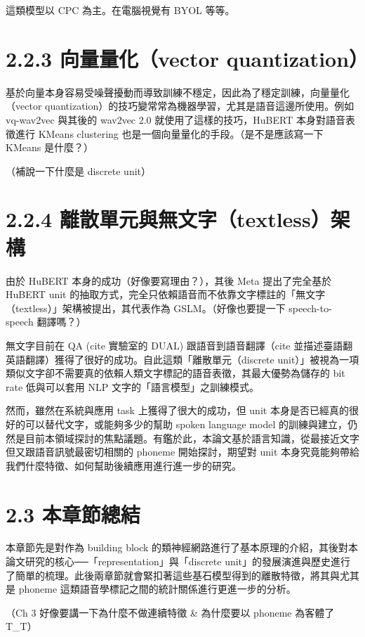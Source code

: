 這類模型以 CPC 為主。在電腦視覺有 BYOL 等等。

\section{2.2.3 向量量化（vector quantization）}

基於向量本身容易受噪聲擾動而導致訓練不穩定，因此為了穩定訓練，向量量化（vector quantization）的技巧變常常為機器學習，尤其是語音這邊所使用。例如 vq-wav2vec 與其後的 wav2vec 2.0 就使用了這樣的技巧，HuBERT 本身對語音表徵進行 KMeans clustering 也是一個向量量化的手段。（是不是應該寫一下 KMeans 是什麼？）

（補說一下什麼是 discrete unit）

\section{2.2.4 離散單元與無文字（textless）架構}

由於 HuBERT 本身的成功（好像要寫理由？），其後 Meta 提出了完全基於 HuBERT unit 的抽取方式，完全只依賴語音而不依靠文字標註的「無文字（textless）」架構被提出，其代表作為 GSLM。（好像也要提一下 speech-to-speech 翻譯嗎？）

無文字目前在 QA (cite 實驗室的 DUAL) 跟語音到語音翻譯（cite 並描述臺語翻英語翻譯）獲得了很好的成功。自此這類「離散單元（discrete unit）」被視為一項類似文字卻不需要真的依賴人類文字標記的語音表徵，其最大優勢為儲存的 bit rate 低與可以套用 NLP 文字的「語言模型」之訓練模式。

然而，雖然在系統與應用 task 上獲得了很大的成功，但 unit 本身是否已經真的很好的可以替代文字，或能夠多少的幫助 spoken language model 的訓練與建立，仍然是目前本領域探討的焦點議題。有鑑於此，本論文基於語言知識，從最接近文字但又跟語音訊號最密切相關的 phoneme 開始探討，期望對 unit 本身究竟能夠帶給我們什麼特徵、如何幫助後續應用進行進一步的研究。

\section{2.3 本章節總結}

本章節先是對作為 building block 的類神經網路進行了基本原理的介紹，其後對本論文研究的核心──「representation」與「discrete unit」的發展演進與歷史進行了簡單的梳理。此後兩章節就會緊扣著這些基石模型得到的離散特徵，將其與尤其是 phoneme 這類語音學標記之間的統計關係進行更進一步的分析。

（Ch 3 好像要講一下為什麼不做連續特徵 \& 為什麼要以 phoneme 為客體了 T\_T）

 